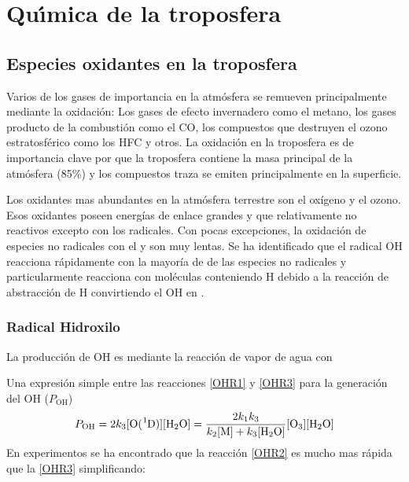 %  
%  

\chapter{Qu\'{\i}mica de la troposfera}

\section{Especies oxidantes en la troposfera}
Varios de los gases de importancia en la atmósfera se remueven principalmente mediante la oxidación: Los gases de efecto invernadero como el metano, los gases producto de la combustión como el CO, los compuestos que destruyen el ozono estratosférico como los HFC y otros. La oxidación en la troposfera es de importancia clave por que la troposfera contiene la masa principal de la atmósfera (85\%) y los compuestos traza se emiten principalmente en la superficie.

Los oxidantes mas abundantes en la atmósfera terrestre son el oxígeno y el ozono. Esos oxidantes poseen energías de enlace grandes y que relativamente no reactivos excepto con los radicales. Con pocas excepciones, la oxidación de especies no radicales con el  y  son muy lentas. Se ha identificado que el radical OH reacciona rápidamente con la mayoría de de las especies no radicales y particularmente reacciona con moléculas conteniendo H debido a la reacción de abstracción de H convirtiendo el OH en . 

\subsection{Radical Hidroxilo}

La producción de OH es mediante la reacción de vapor de agua con 


Una expresión simple entre las reacciones \ref{OHR1} y \ref{OHR3}  para la generación del OH  ($P_\mathrm{OH}$) 
\begin{equation}
P_\mathrm{OH}= 2k_3 [\ce{O(^1D)}] [\ce{H2O}] = \frac{2k_1k_3}{k_2[\mathrm{M]}+k_3[\ce{H2O}]} [\ce{O3}][\ce{H2O}] 
\end{equation}
En experimentos se ha encontrado que la reacción \ref{OHR2} es mucho mas rápida que la \ref{OHR3} simplificando:

